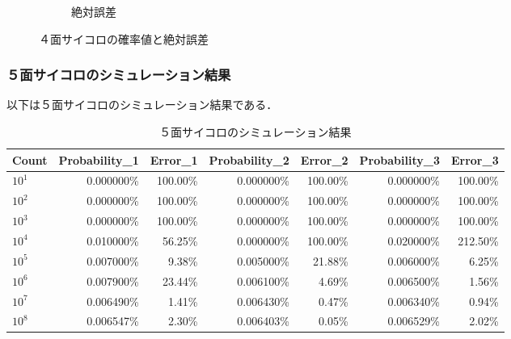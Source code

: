 \documentclass[a4j, titlepage]{jarticle}
\begin{document}
\begin{figure}[htb]
\begin{subfigure}[b]{0.38\textwidth}
          \caption{絶対誤差}
          \label{fig:errdic4}
        \end{subfigure}
        \hfill
            \caption{４面サイコロの確率値と絶対誤差}
           \label{fig:resdic4}
      \end{figure}
    
      \subsubsection{５面サイコロのシミュレーション結果}
        以下は５面サイコロのシミュレーション結果である．

        \begin{longtable}[c]{|l|r|r|r|r|r|r|}
          \caption{５面サイコロのシミュレーション結果}
          \label{tab:dice5}\\
          \hline
          \rowcolor[HTML]{C0C0C0} 
          Count    & Probability\_1 & Error\_1 & Probability\_2 & Error\_2 & Probability\_3 & Error\_3 \\ \hline
          \endfirsthead
          \endhead
          $10^1$   & 0.000000\%     & 100.00\%         & 0.000000\%     & 100.00\%         & 0.000000\%     & 100.00\%         \\ \hline
          $10^2$   & 0.000000\%     & 100.00\%         & 0.000000\%     & 100.00\%         & 0.000000\%     & 100.00\%         \\ \hline
          $10^3$   & 0.000000\%     & 100.00\%         & 0.000000\%     & 100.00\%         & 0.000000\%     & 100.00\%         \\ \hline
          $10^4$   & 0.010000\%     & 56.25\%          & 0.000000\%     & 100.00\%         & 0.020000\%     & 212.50\%         \\ \hline
          $10^5$   & 0.007000\%     & 9.38\%           & 0.005000\%     & 21.88\%          & 0.006000\%     & 6.25\%           \\ \hline
          $10^6$   & 0.007900\%     & \cellcolor[HTML]{FD6864}23.44\%          & 0.006100\%     & 4.69\%           & 0.006500\%     & 1.56\%           \\ \hline
          $10^7$   & 0.006490\%     & 1.41\%           & 0.006430\%     & 0.47\%           & 0.006340\%     & 0.94\%           \\ \hline
          $10^8$   & 0.006547\%     & 2.30\%           & 0.006403\%     & 0.05\%           & 0.006529\%     & 2.02\%           \\ \hline
        \end{longtable}
        
\end{document}

